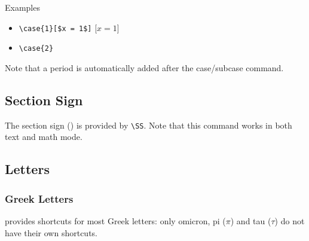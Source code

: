 \begin{myframe}{Examples}
    \begin{itemize}
        \item \verb|\case{1}[$x = 1$]| \produces{} [$x = 1$]
        \item \verb|\case{2}| \produces{} 
    \end{itemize}
\end{myframe}

Note that a period is automatically added after the case/subcase command.

\subsection{Section Sign}

The section sign (\SS) is provided by \verb|\SS|. Note that this command works in both text and math mode.

\subsection{Letters}

\subsubsection{Greek Letters}

\asdiasty{} provides shortcuts for most Greek letters: only omicron, pi ($\pi$) and tau ($\tau$) do not have their own shortcuts.

